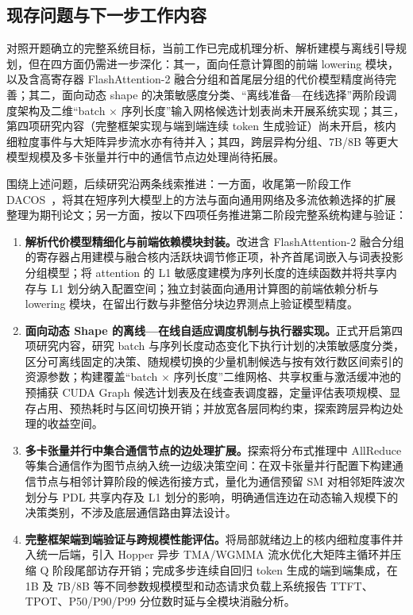 \subsection{现存问题与下一步工作内容}

对照开题确立的完整系统目标，当前工作已完成机理分析、解析建模与离线引导规划，但在四方面仍需进一步深化：其一，面向任意计算图的前端 lowering 模块，以及含高寄存器 FlashAttention-2 融合分组和首尾层分组的代价模型精度尚待完善；其二，面向动态 shape 的决策敏感度分类、“离线准备—在线选择”两阶段调度架构及二维“batch $\times$ 序列长度”输入网格候选计划表尚未开展系统实现；其三，第四项研究内容（完整框架实现与端到端连续 token 生成验证）尚未开启，核内细粒度事件与大矩阵异步流水亦有待并入；其四，跨层异构分组、7B/8B 等更大模型规模及多卡张量并行中的通信节点边处理尚待拓展。

围绕上述问题，后续研究沿两条线索推进：一方面，收尾第一阶段工作 DACOS~\pDacos，将其在短序列大模型上的方法与面向通用网络及多流依赖选择的扩展整理为期刊论文；另一方面，按以下四项任务推进第二阶段完整系统构建与验证：
\begin{enumerate}[leftmargin=2.4em,itemsep=3pt]
\item \textbf{解析代价模型精细化与前端依赖模块封装。}改进含 FlashAttention-2 融合分组的寄存器占用建模与融合核内活跃块调节修正项，补齐首尾词嵌入与词表投影分组模型；将 attention 的 L1 敏感度建模为序列长度的连续函数并将共享内存与 L1 划分纳入配置空间；独立封装面向通用计算图的前端依赖分析与 lowering 模块，在留出行数与非整倍分块边界测点上验证模型精度。

\item \textbf{面向动态 Shape 的离线—在线自适应调度机制与执行器实现。}正式开启第四项研究内容，研究 batch 与序列长度动态变化下执行计划的决策敏感度分类，区分可离线固定的决策、随规模切换的少量机制候选与按有效行数区间索引的资源参数；构建覆盖“batch $\times$ 序列长度”二维网格、共享权重与激活缓冲池的预捕获 CUDA Graph 候选计划表及在线查表调度器，定量评估表项规模、显存占用、预热耗时与区间切换开销；并放宽各层同构约束，探索跨层异构边处理的收益空间。

\item \textbf{多卡张量并行中集合通信节点的边处理扩展。}探索将分布式推理中 AllReduce 等集合通信作为图节点纳入统一边级决策空间：在双卡张量并行配置下构建通信节点与相邻计算阶段的候选衔接方式，量化为通信预留 SM 对相邻矩阵波次划分与 PDL 共享内存及 L1 划分的影响，明确通信连边在动态输入规模下的决策类别，不涉及底层通信路由算法设计。

\item \textbf{完整框架端到端验证与跨规模性能评估。}将局部就绪边上的核内细粒度事件并入统一后端，引入 Hopper 异步 TMA/WGMMA 流水优化大矩阵主循环并压缩 Q 阶段尾部访存开销；完成多步连续自回归 token 生成的端到端集成，在 1B 及 7B/8B 等不同参数规模模型和动态请求负载上系统报告 TTFT、TPOT、P50/P90/P99 分位数时延与全模块消融分析。
\end{enumerate}

